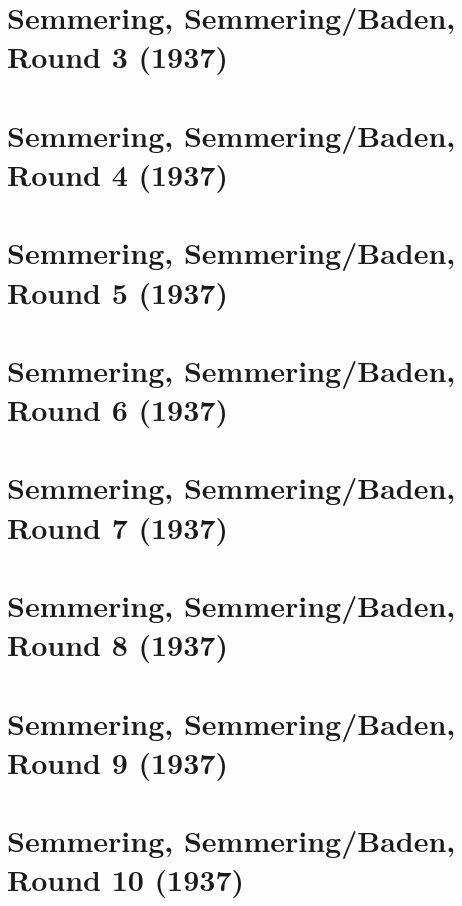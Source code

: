 \documentclass[11pt]{article}
\begin{document}
\clearpage

\section{Semmering, Semmering/Baden, Round 3 (1937)}


\clearpage

\section{Semmering, Semmering/Baden, Round 4 (1937)}


\clearpage

\section{Semmering, Semmering/Baden, Round 5 (1937)}


\clearpage

\section{Semmering, Semmering/Baden, Round 6 (1937)}


\clearpage

\section{Semmering, Semmering/Baden, Round 7 (1937)}


\clearpage

\section{Semmering, Semmering/Baden, Round 8 (1937)}


\clearpage

\section{Semmering, Semmering/Baden, Round 9 (1937)}


\clearpage

\section{Semmering, Semmering/Baden, Round 10 (1937)}

\end{document}
